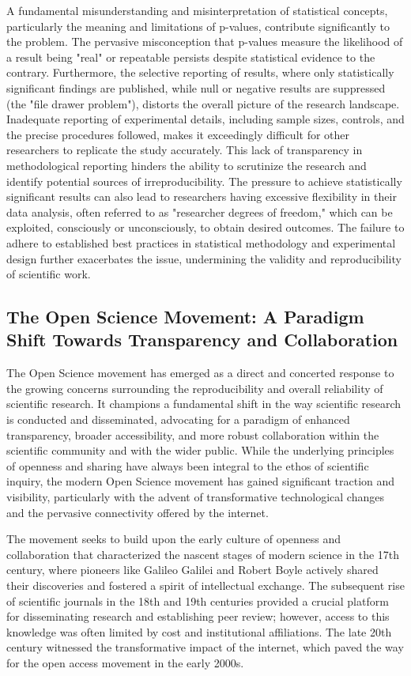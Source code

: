 \documentclass{article}
\begin{document}
A fundamental misunderstanding and misinterpretation of statistical concepts, particularly the meaning and limitations of p-values, contribute significantly to the problem. The pervasive misconception that p-values measure the likelihood of a result being "real" or repeatable persists despite statistical evidence to the contrary. Furthermore, the selective reporting of results, where only statistically significant findings are published, while null or negative results are suppressed (the "file drawer problem"), distorts the overall picture of the research landscape. Inadequate reporting of experimental details, including sample sizes, controls, and the precise procedures followed, makes it exceedingly difficult for other researchers to replicate the study accurately. This lack of transparency in methodological reporting hinders the ability to scrutinize the research and identify potential sources of irreproducibility. The pressure to achieve statistically significant results can also lead to researchers having excessive flexibility in their data analysis, often referred to as "researcher degrees of freedom," which can be exploited, consciously or unconsciously, to obtain desired outcomes. The failure to adhere to established best practices in statistical methodology and experimental design further exacerbates the issue, undermining the validity and reproducibility of scientific work.

\subsection{The Open Science Movement: A Paradigm Shift Towards Transparency and Collaboration}

The Open Science movement has emerged as a direct and concerted response to the growing concerns surrounding the reproducibility and overall reliability of scientific research. It champions a fundamental shift in the way scientific research is conducted and disseminated, advocating for a paradigm of enhanced transparency, broader accessibility, and more robust collaboration within the scientific community and with the wider public. While the underlying principles of openness and sharing have always been integral to the ethos of scientific inquiry, the modern Open Science movement has gained significant traction and visibility, particularly with the advent of transformative technological changes and the pervasive connectivity offered by the internet.

The movement seeks to build upon the early culture of openness and collaboration that characterized the nascent stages of modern science in the 17th century, where pioneers like Galileo Galilei and Robert Boyle actively shared their discoveries and fostered a spirit of intellectual exchange. The subsequent rise of scientific journals in the 18th and 19th centuries provided a crucial platform for disseminating research and establishing peer review; however, access to this knowledge was often limited by cost and institutional affiliations. The late 20th century witnessed the transformative impact of the internet, which paved the way for the open access movement in the early 2000s.
\end{document}
